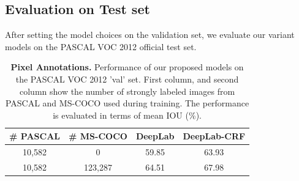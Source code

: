 \subsection{Evaluation on Test set}
After setting the model choices on the validation set, we evaluate our variant models on the PASCAL VOC 2012 official test set.

\begin{table}
  \centering
  \caption{{\bf{Pixel Annotations.}} Performance of our proposed models on the PASCAL VOC 2012 'val' set. First column, and second column show the number of strongly labeled images from PASCAL and MS-COCO used during training. The performance is evaluated in terms of mean IOU (\%).}
  \begin{tabular}{| c | c | c | c |}
    \hline
    \# PASCAL & \# MS-COCO & DeepLab & DeepLab-CRF \\
    \hline
    10,582 &   0     & 59.85 & 63.93  \\
    \hline
    10,582 & 123,287 & 64.51 & 67.98 \\
    \hline
    \end{tabular}
  \label{tb:pixel_annot}
\end{table}

\begin{table}[t]
  \centering
  \caption{{\bf Pixel+Image Annotations.} }
  \label{tab:strong_weak_annot}
\end{table}

